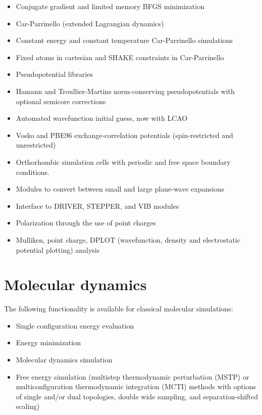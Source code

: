 \begin{itemize}
\item Conjugate gradient and limited memory BFGS minimization
\item Car-Parrinello (extended Lagrangian dynamics)
\item Constant energy and constant temperature Car-Parrinello simulations
\item Fixed atoms in cartesian and SHAKE constraints in Car-Parrinello
\item Pseudopotential libraries
\item Hamann and Troullier-Martins norm-conserving pseudopotentials with 
optional semicore corrections
\item Automated wavefunction initial guess, now with LCAO
\item Vosko and PBE96 exchange-correlation potentials (spin-restricted 
and unrestricted)
\item Orthorhombic simulation cells with periodic and
free space boundary conditions.
\item Modules to convert between small and large plane-wave expansions
\item Interface to DRIVER, STEPPER, and VIB modules
\item Polarization through the use of point charges
\item Mulliken, point charge, DPLOT (wavefunction, density and electrostatic
potential plotting) analysis
\end{itemize}


\section{Molecular dynamics}

The following functionality is available for classical molecular
simulations:
\begin{itemize}
\item Single configuration energy evaluation
\item Energy minimization
\item Molecular dynamics simulation
\item Free energy simulation  (multistep thermodynamic perturbation (MSTP) or
    multiconfiguration thermodynamic integration (MCTI) methods with
    options of single and/or dual topologies, double wide sampling, and
    separation-shifted scaling)
\end{itemize}

